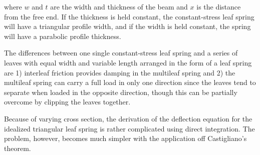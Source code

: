 \documentclass[
10pt,
a4paper,
openany,
svgnames,
]{book}
\begin{document}
where $w$ and $t$ are the width and thickness of the beam and $x$ is the distance from the free end. If the thickness is held constant, the constant-stress leaf spring will have a triangular profile width, and if the width is held constant, the spring will have a parabolic profile thickness.

The differences between one single constant-stress leaf spring and a series of leaves with equal width and variable length arranged in the form of a leaf spring are 1) interleaf friction provides damping in the multileaf spring and 2) the multileaf spring can carry a full load in only one direction since the leaves tend to separate when loaded in the opposite direction, though this can be partially overcome by clipping the leaves together.

Because of varying cross section, the derivation of the deflection equation for the idealized triangular leaf spring is rather complicated using direct integration. The problem, however, becomes much simpler with the application off Castigliano’s theorem.
\end{document}
